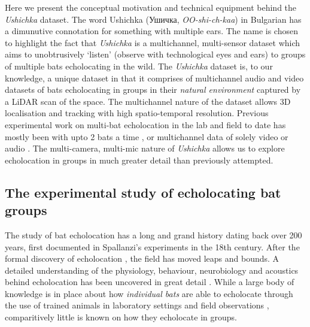 \documentclass[
]{book}
\begin{document}
Here we present the conceptual motivation and technical equipment behind the \emph{Ushichka} dataset. The word Ushichka (Ушичка, \emph{OO-shi-ch-kaa}) in Bulgarian has a dimunutive connotation for something with multiple ears. The name is chosen to highlight the fact that \emph{Ushichka} is a multichannel, multi-sensor dataset which aims to unobtrusively `listen' (observe with technological eyes and ears) to groups of multiple bats echolocating in the wild. The \emph{Ushichka} dataset is, to our knowledge, a unique dataset in that it comprises of multichannel audio and video datasets of bats echolocating in groups in their \emph{natural environment} captured by a LiDAR scan of the space. The multichannel nature of the dataset allows 3D localisation and tracking with high spatio-temporal resolution. Previous experimental work on multi-bat echolocation in the lab and field to date has mostly been with upto 2 bats a time \citep{goetze2016a, giuggioli2015a, necknig2011between, fawcett2015clutter, fawcett2015echolocation}, or multichannel data of solely video or audio \citep{theriault2010a, lin2016bats}. The multi-camera, multi-mic nature of \emph{Ushichka} allows us to explore echolocation in groups in much greater detail than previously attempted.

\hypertarget{the-experimental-study-of-echolocating-bat-groups}{%
\subsection{The experimental study of echolocating bat groups}\label{the-experimental-study-of-echolocating-bat-groups}}

The study of bat echolocation has a long and grand history dating back over 200 years, first documented in Spallanzi's experiments in the 18th century.
After the formal discovery of echolocation \citep{Griffin1958, Dijkgraaf1946}, the field has moved leaps and bounds. A detailed understanding of the physiology, behaviour, neurobiology and acoustics behind echolocation has been uncovered in great detail \citep{popper1995hearing, Fenton2016}. While a large body of knowledge is in place about how \emph{individual bats} are able to echolocate through the use of trained animals in laboratory settings and field observations \citep{Fenton2016}, comparitively little is known on how they echolocate in groups\citep{ulanovsky2008bat}.
\end{document}
